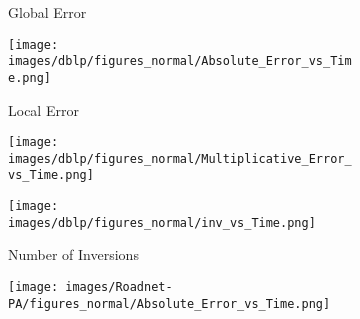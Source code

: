 



\begin{figure*}[htbp]
	\centering
	\begin{subfigure}[b]{\textwidth}
		\centering
		\begin{minipage}[b]{0.05\textwidth}
			\centering
		\end{minipage}%
		\begin{minipage}[b]{0.3\textwidth}
			\centering
			\caption*{Global Error} %
			\texttt{[image: images/dblp/figures\_normal/Absolute\_Error\_vs\_Time.png]} %
			
		\end{minipage}%
		\begin{minipage}[b]{0.3\textwidth}
			\centering
			\caption*{Local Error} %
			\texttt{[image: images/dblp/figures\_normal/Multiplicative\_Error\_vs\_Time.png]} %
			
		\end{minipage}%
		\begin{minipage}[b]{0.3\textwidth}
			\centering
			\caption*{Number of Inversions} %
			\texttt{[image: images/dblp/figures\_normal/inv\_vs\_Time.png]} %
		\end{minipage}
	\end{subfigure}
	\begin{subfigure}[b]{\textwidth}
		\centering
		\begin{minipage}[b]{0.05\textwidth}
			\centering
		\end{minipage}%
		\begin{minipage}[b]{0.3\textwidth}
			\centering
			\texttt{[image: images/Roadnet-PA/figures\_normal/Absolute\_Error\_vs\_Time.png]} %
			

\end{minipage}
\end{subfigure}
\end{figure*}
